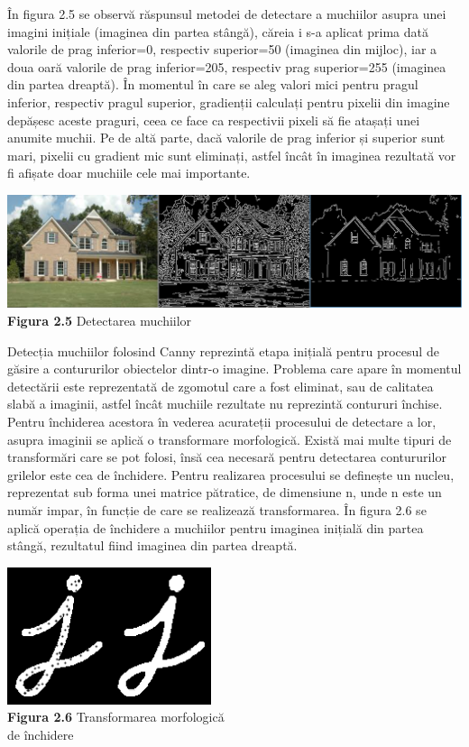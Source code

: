 \documentclass[a4paper,12pt]{report}
\newcommand\tab[1][1cm]{\hspace*{#1}}
\begin{document}
\tab În figura 2.5 se observă răspunsul metodei de detectare a muchiilor asupra unei imagini inițiale (imaginea din partea stângă), căreia i s-a aplicat prima dată valorile de prag inferior=0, respectiv superior=50 (imaginea din mijloc), iar 
a doua oară valorile de prag inferior=205, respectiv prag superior=255 (imaginea din partea dreaptă). În momentul în care se aleg valori mici pentru pragul inferior, respectiv pragul superior, gradienții calculați pentru pixelii din imagine depășesc aceste praguri, ceea
ce face ca respectivii pixeli să fie atașați unei anumite muchii. Pe de altă parte, dacă valorile de prag inferior și superior sunt mari, pixelii cu gradient mic sunt eliminați, astfel încât în imaginea rezultată vor fi afișate doar muchiile cele mai importante. 
\begin {center} 
	\begin {footnotesize} 
		\includegraphics[width = 160mm]{fig2_5} \\
		\textbf  {Figura 2.5} Detectarea muchiilor
	\end {footnotesize} 
\end {center}
\tab Detecția muchiilor folosind Canny reprezintă etapa inițială pentru procesul de găsire a contururilor obiectelor dintr-o imagine. Problema care apare în momentul detectării este reprezentată de zgomotul care a fost eliminat, sau de calitatea slabă a imaginii, astfel încât muchiile
rezultate nu reprezintă contururi închise. Pentru închiderea acestora în vederea acurateții procesului de detectare a lor, asupra imaginii se aplică o transformare morfologică. Există mai multe tipuri de transformări care se pot folosi, însă cea necesară 
pentru detectarea contururilor grilelor este cea de închidere. Pentru realizarea procesului se definește un nucleu, reprezentat sub forma unei matrice pătratice, de dimensiune n, unde n este un număr impar, în funcție de care se realizează transformarea.
 În figura 2.6 se aplică operația de închidere a muchiilor pentru imaginea inițială din partea stângă, rezultatul fiind imaginea din partea dreaptă.   
\begin {center} 
	\begin {footnotesize} 
		\includegraphics[width = 60mm]{fig2_6} \\
		\textbf  {Figura 2.6} Transformarea morfologică\\ de închidere \cite{opencv1}
	\end {footnotesize} 
\end {center}
\end{document}

